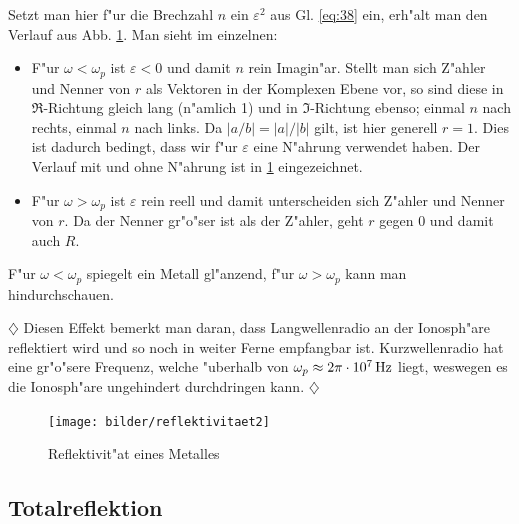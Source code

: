 \documentclass[twoside,a4paper]{book}
\newenvironment*{Beispiel}[0]{$\diamondsuit$\sffamily}{ \hfill $\diamondsuit$}
\begin{document}
 Setzt man hier f"ur die
Brechzahl $n$ ein $\varepsilon^2$ aus Gl. \eqref{eq:38} ein, erh"alt
man den Verlauf aus Abb. \ref{abb_reflektivitaet}.  Man sieht im
einzelnen:
\begin{itemize}
\item F"ur $\omega < \omega_p$ ist $\varepsilon < 0$ und damit $n$
   rein Imagin"ar. Stellt man sich Z"ahler und Nenner von $r$ als
   Vektoren in der Komplexen Ebene vor, so sind diese in
   $\Re$-Richtung gleich lang (n"amlich 1) und in $\Im$-Richtung
   ebenso; einmal $n$ nach rechts, einmal $n$ nach links. Da $|a/b| =
   |a|/|b|$ gilt, ist hier generell $r = 1$. Dies ist dadurch bedingt,
   dass wir f"ur $\varepsilon$ eine N"ahrung verwendet haben. Der
   Verlauf mit und ohne N"ahrung ist in \ref{abb_reflektivitaet}
   eingezeichnet.
\item F"ur $\omega > \omega_p$ ist $\varepsilon$ rein reell und damit
   unterscheiden sich Z"ahler und Nenner von $r$. Da der Nenner
   gr"o"ser ist als der Z"ahler, geht $r$ gegen $0$ und damit auch $R$.
\end{itemize}

\begin{Wichtig}
   F"ur $\omega < \omega_p$ spiegelt ein Metall gl"anzend, f"ur
   $\omega > \omega_p$ kann man hindurchschauen.
\end{Wichtig}
\begin{Beispiel}
   Diesen Effekt bemerkt man daran, dass Langwellenradio an der
   Ionosph"are reflektiert wird und so noch in weiter Ferne empfangbar
   ist. Kurzwellenradio hat eine gr"o"sere Frequenz, welche "uberhalb
   von $\omega_p \approx 2\pi \cdot \unit[10^7]{Hz}$ liegt, weswegen es die Ionosph"are ungehindert
   durchdringen kann.
\end{Beispiel}




\begin{figure}
   \centering
   \texttt{[image: bilder/reflektivitaet2]}
   \caption{Reflektivit"at eines Metalles}
   \label{abb_reflektivitaet}
\end{figure}









\subsection{Totalreflektion}
\label{kap_totalreflektion}
\end{document}

